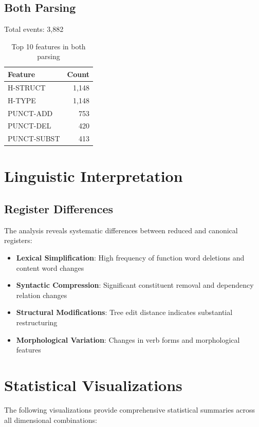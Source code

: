 \documentclass[11pt,a4paper]{article}
\begin{document}
\subsection{Both Parsing}

Total events: 3,882

\begin{table}[h]
\centering
\begin{tabular}{lr}
\toprule
Feature & Count \\
\midrule
H-STRUCT & 1,148 \\
H-TYPE & 1,148 \\
PUNCT-ADD & 753 \\
PUNCT-DEL & 420 \\
PUNCT-SUBST & 413 \\
\bottomrule
\end{tabular}
\caption{Top 10 features in both parsing}
\end{table}

\section{Linguistic Interpretation}

\subsection{Register Differences}

The analysis reveals systematic differences between reduced and canonical registers:

\begin{itemize}
\item \textbf{Lexical Simplification}: High frequency of function word deletions and content word changes
\item \textbf{Syntactic Compression}: Significant constituent removal and dependency relation changes
\item \textbf{Structural Modifications}: Tree edit distance indicates substantial restructuring
\item \textbf{Morphological Variation}: Changes in verb forms and morphological features
\end{itemize}

\section{Statistical Visualizations}

The following visualizations provide comprehensive statistical summaries across all dimensional combinations:
\end{document}
